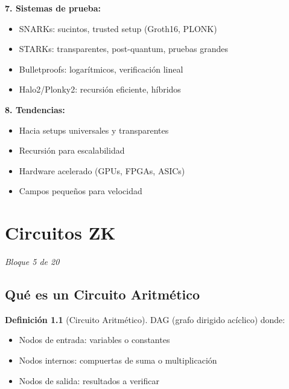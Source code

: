 \documentclass[11pt,a4paper,twoside,openright]{book}
\theoremstyle{definition}
\newtheorem{definition}{Definición}[chapter]
\theoremstyle{plain}
\theoremstyle{remark}
\begin{document}
\begin{keyidea}
\textbf{7. Sistemas de prueba:}
\begin{itemize}
    \item SNARKs: sucintos, trusted setup (Groth16, PLONK)
    \item STARKs: transparentes, post-quantum, pruebas grandes
    \item Bulletproofs: logarítmicos, verificación lineal
    \item Halo2/Plonky2: recursión eficiente, híbridos
\end{itemize}

\textbf{8. Tendencias:}
\begin{itemize}
    \item Hacia setups universales y transparentes
    \item Recursión para escalabilidad
    \item Hardware acelerado (GPUs, FPGAs, ASICs)
    \item Campos pequeños para velocidad
\end{itemize}
\end{keyidea}

\cleardoublepage

\chapter{Circuitos ZK}
\label{ch:bloque5}

\begin{center}
\textit{Bloque 5 de 20}
\end{center}

\section{Qué es un Circuito Aritmético}

\begin{definition}[Circuito Aritmético]
DAG (grafo dirigido acíclico) donde:
\begin{itemize}
    \item Nodos de entrada: variables o constantes
    \item Nodos internos: compuertas de suma o multiplicación
    \item Nodos de salida: resultados a verificar
\end{itemize}
\end{definition}
\end{document}
